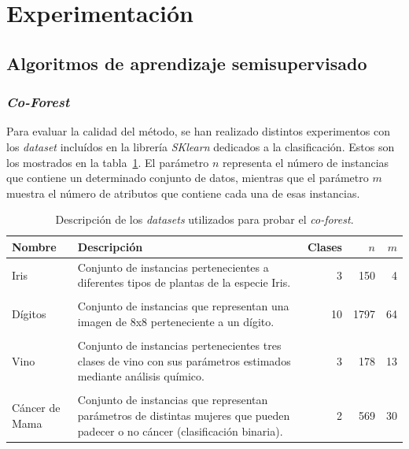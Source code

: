 


\section{Experimentación}

\subsection{Algoritmos de aprendizaje semisupervisado}

\subsubsection{\textit{Co-Forest}}

Para evaluar la calidad del método, se han realizado distintos experimentos con los \textit{dataset} incluídos en la librería \textit{SKlearn} dedicados a la clasificación. Estos son los mostrados en la tabla~\ref{tabla_datasets_sklearn}. El parámetro $n$ representa el número de instancias que contiene un determinado conjunto de datos, mientras que el parámetro $m$ muestra el número de atributos que contiene cada una de esas instancias.

\begin{table}
	\small
	\begin{centering}
		
		\begin{tabular}{@{}p{4em} p{20em} r r r @{}}
			\toprule
			\textbf{Nombre} & \textbf{Descripción} & \textbf{Clases} & $n$ & $m$\\ 
			\midrule
			
			Iris & Conjunto de instancias pertenecientes a diferentes tipos de plantas de la especie Iris. & 3 & 150 & 4 \\\\
			Dígitos & Conjunto de instancias que representan una imagen de 8x8 perteneciente a un dígito. & 10 & 1797 & 64 \\\\
			Vino & Conjunto de instancias pertenecientes tres clases de vino con sus parámetros estimados mediante análisis químico. & 3 & 178 & 13 \\\\
			Cáncer de Mama & Conjunto de instancias que representan parámetros de distintas mujeres que pueden padecer o no cáncer (clasificación binaria). & 2 & 569 & 30 \\
		\end{tabular}
		
	\end{centering}
	\caption{Descripción de los \textit{datasets} utilizados para probar el \textit{co-forest}.}
	\label{tabla_datasets_sklearn}	
\end{table}


